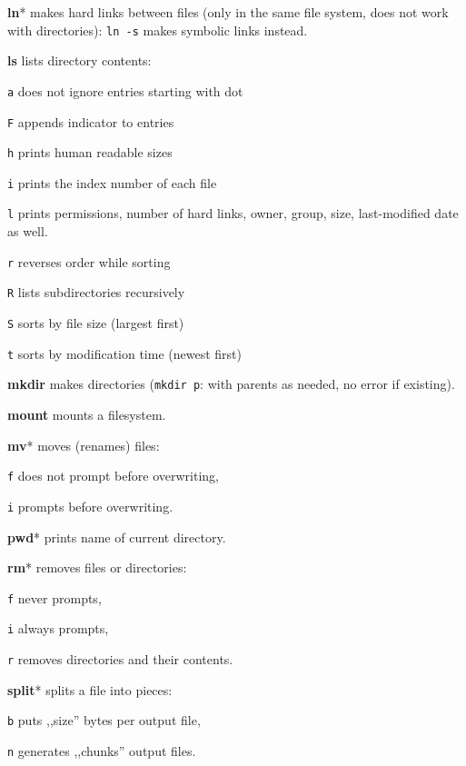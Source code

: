 \textbf{ln}* makes hard links between files
(only in the same file system, does not work with directories):
\texttt{ln -s} makes symbolic links instead.

\textbf{ls} lists directory contents:
\begin{enumx}
	\item [\texttt{a}] does not ignore entries starting with dot
	\item [\texttt{F}] appends indicator to entries
	\item [\texttt{h}] prints human readable sizes
	\item [\texttt{i}] prints the index number of each file
	\item [\texttt{l}] prints permissions, number of hard links, owner, group, size, last-modified date as well.
	\item [\texttt{r}] reverses order while sorting
	\item [\texttt{R}] lists subdirectories recursively
	\item [\texttt{S}] sorts by file size (largest first)
	\item [\texttt{t}] sorts by modification time (newest first)
\end{enumx}

\manualbreak

\textbf{mkdir} makes directories (\texttt{mkdir p}: with parents as needed, no
error if existing).

\textbf{mount} mounts a filesystem.

\textbf{mv}* moves (renames) files:
\begin{enumx}
	\item [\texttt{f}] does not prompt before overwriting,
	\item [\texttt{i}] prompts before overwriting.
\end{enumx}

\textbf{pwd}* prints name of current directory.

\textbf{rm}* removes files or directories:
\begin{enumx}
	\item [\texttt{f}] never prompts,
	\item [\texttt{i}] always prompts,
	\item [\texttt{r}] removes directories and their contents.
\end{enumx}


\textbf{split}* splits a file into pieces:
\begin{enumx}
	\item [\texttt{b}] puts ,,size'' bytes per output file,
	\item [\texttt{n}] generates ,,chunks'' output files.
\end{enumx}

